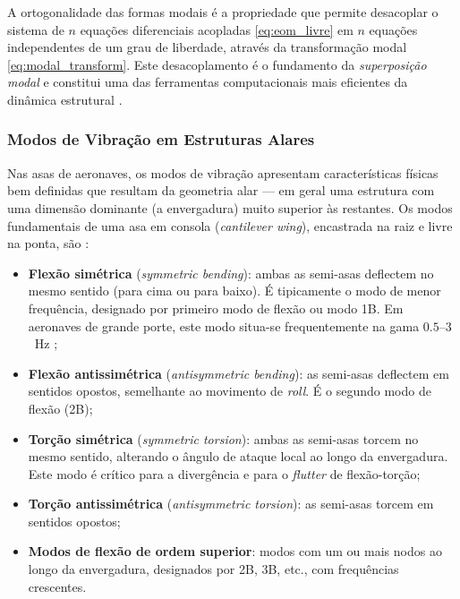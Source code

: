 \documentclass[a4paper,fleqn]{cas-sc}
\begin{document}
A ortogonalidade das formas modais é a propriedade que permite desacoplar o sistema de $n$ equações diferenciais acopladas \eqref{eq:eom_livre} em $n$ equações independentes de um grau de liberdade, através da transformação modal \eqref{eq:modal_transform}. Este desacoplamento é o fundamento da \textit{superposição modal} e constitui uma das ferramentas computacionais mais eficientes da dinâmica estrutural \cite{Craig2006}.

\subsubsection{Modos de Vibração em Estruturas Alares}

Nas asas de aeronaves, os modos de vibração apresentam características físicas bem definidas que resultam da geometria alar --- em geral uma estrutura com uma dimensão dominante (a envergadura) muito superior às restantes. Os modos fundamentais de uma asa em consola (\textit{cantilever wing}), encastrada na raiz e livre na ponta, são \cite{Bisplinghoff1996, Wright2015}:

\begin{itemize}
    \item \textbf{Flexão simétrica} (\textit{symmetric bending}): ambas as semi-asas deflectem no mesmo sentido (para cima ou para baixo). É tipicamente o modo de menor frequência, designado por primeiro modo de flexão ou modo 1B. Em aeronaves de grande porte, este modo situa-se frequentemente na gama $0.5$--$3$~\si{\hertz} \cite{Megson2012};

    \item \textbf{Flexão antissimétrica} (\textit{antisymmetric bending}): as semi-asas deflectem em sentidos opostos, semelhante ao movimento de \textit{roll}. É o segundo modo de flexão (2B);

    \item \textbf{Torção simétrica} (\textit{symmetric torsion}): ambas as semi-asas torcem no mesmo sentido, alterando o ângulo de ataque local ao longo da envergadura. Este modo é crítico para a divergência e para o \textit{flutter} de flexão-torção;

    \item \textbf{Torção antissimétrica} (\textit{antisymmetric torsion}): as semi-asas torcem em sentidos opostos;

    \item \textbf{Modos de flexão de ordem superior}: modos com um ou mais nodos ao longo da envergadura, designados por 2B, 3B, etc., com frequências crescentes.
\end{itemize}
\end{document}
